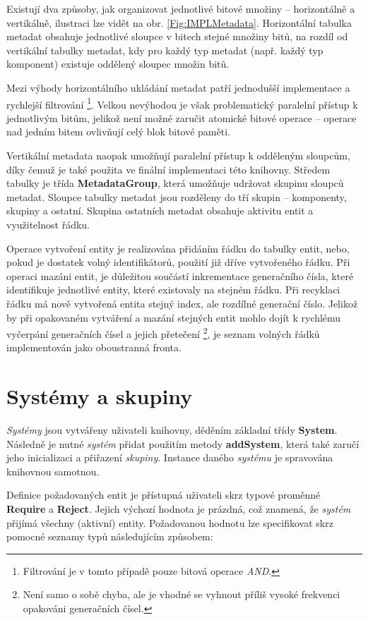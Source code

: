 Existují dva způsoby, jak organizovat jednotlivé bitové množiny -- horizontálně a vertikálně, ilustraci lze vidět na obr. \ref{Fig:IMPLMetadata}. Horizontální tabulka metadat obsahuje jednotlivé sloupce v bitech stejné množiny bitů, na rozdíl od vertikální tabulky metadat, kdy pro každý typ metadat (např. každý typ komponent) existuje oddělený sloupec množin bitů. 

Mezi výhody horizontálního ukládání metadat patří jednodušší implementace a rychlejší filtrování \footnote{Filtrování je v tomto případě pouze bitová operace \emph{AND}.}. Velkou nevýhodou je však problematický paralelní přístup k jednotlivým bitům, jelikož není možné zaručit atomické bitové operace -- operace nad jedním bitem ovlivňují celý blok bitové paměti. 

Vertikální metadata naopak umožňují paralelní přístup k odděleným sloupcům, díky čemuž je také použita ve finální implementaci této knihovny. Středem tabulky je třída \textbf{MetadataGroup}, která umožňuje udržovat skupinu sloupců metadat. Sloupce tabulky metadat jsou rozděleny do tří skupin -- komponenty, skupiny a ostatní. Skupina ostatních metadat obsahuje aktivitu entit a využitelnost řádku.

Operace vytvoření entity je realizována přidáním řádku do tabulky entit, nebo, pokud je dostatek volný identifikátorů, použití již dříve vytvořeného řádku. Při operaci mazáni entit, je důležitou součástí inkrementace generačního čísla, které identifikuje jednotlivé entity, které existovaly na stejném řádku. Při recyklaci řádku má nově vytvořená entita stejný index, ale rozdílné generační číslo. Jelikož by při opakovaném vytváření a mazání stejných entit mohlo dojít k rychlému vyčerpání generačních čísel a jejich přetečení \footnote{Není samo o sobě chyba, ale je vhodné se vyhnout příliš vysoké frekvenci opakováni generačních čísel.}, je seznam volných řádků implementován jako oboustranná fronta.

\section{Systémy a skupiny}
\label{Chap:ImplSystem}

\emph{Systémy} jsou vytvářeny uživateli knihovny, děděním základní třídy \textbf{System}. Následně je nutné \emph{systém} přidat použitím metody \textbf{addSystem}, která také zaručí jeho inicializaci a přiřazení \emph{skupiny}. Instance daného \emph{systému} je spravována knihovnou samotnou.

Definice požadovaných entit je přístupná uživateli skrz typové proměnné \textbf{Require} a \textbf{Reject}. Jejich výchozí hodnota je prázdná, což znamená, že \emph{systém} přijímá všechny (aktivní) entity. Požadovanou hodnotu lze specifikovat skrz pomocné seznamy typů následujícím způsobem: 


